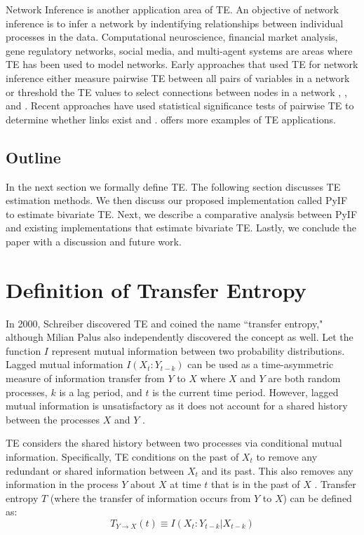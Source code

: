 \documentclass[conference]{IEEEtran}
\begin{document}
Network Inference is another application area of TE. An objective of network inference is to infer a network by indentifying relationships between individual processes in the data. Computational neuroscience, financial market analysis, gene regulatory networks, social media, and multi-agent systems are areas where TE has been used to model networks. Early approaches that used TE for  network inference either measure pairwise TE between all pairs of variables in a network or threshold the TE values to select connections between nodes in a network \cite{NetworkTEApp1}, \cite{NetworkTEApp2}, and \cite{NetworkTEApp3}. Recent approaches have used statistical significance tests of pairwise TE to determine whether links exist \cite{NetworkTEApp4} and \cite{NetworkTEApp5}. \cite{TEBook} offers more examples of TE applications.

\subsection{Outline}
In the next section we formally define TE. The following section discusses TE estimation methods. We then discuss our proposed implementation called PyIF to estimate bivariate TE. Next, we describe a comparative analysis between PyIF and existing implementations that estimate bivariate TE. Lastly, we conclude the paper with a discussion and future work.


\section{Definition of Transfer Entropy}

In 2000, Schreiber \cite{IntroToTransferEntropy} discovered TE and coined the name ``transfer entropy," although Milian Palus \cite{IntroToTransferEntropy2} also independently discovered the concept as well. Let the function \(I\) represent mutual information between two probability distributions. Lagged mutual information \(I(X_t : Y_{t-k})\) can be used as a time-asymmetric measure of information transfer from \(Y\) to \(X\) where \(X\) and \(Y\) are both random processes, \(k\) is a lag period, and \(t\) is the current time period. However, lagged mutual information is unsatisfactory as it does not account for a shared history between the processes \(X\) and \(Y\) \cite{MIdiffTE}.

TE considers the shared history between two processes via conditional mutual information. Specifically, TE conditions on the past of \(X_t\) to remove any redundant or shared information between \(X_t\) and its past. This also removes any information in the process \(Y\) about \(X\) at time \(t\) that is in the past of \(X\) \cite{b359}. Transfer entropy \(T\) (where the transfer of information occurs from \(Y\) to \(X\)) can be defined as:
\begin{equation}
T_{Y \rightarrow X} (t) \equiv I(X_t: Y_{t-k} |  X_{t-k})
\end{equation}
\end{document}

